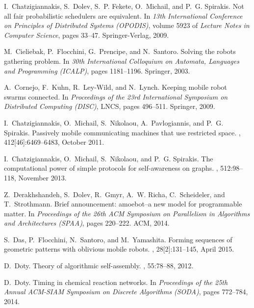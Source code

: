 \documentclass[preprint]{elsarticle}
\begin{document}
\begin{thebibliography}{CKLWL09}
I.~Chatzigiannakis, S.~Dolev, S.~P. Fekete, O.~Michail, and P.~G. Spirakis.
\newblock Not all fair probabilistic schedulers are equivalent.
\newblock In {\em 13th International Conference on Principles of Distributed
  Systems (OPODIS)}, volume 5923 of {\em Lecture Notes in Computer Science},
  pages 33--47. Springer-Verlag, 2009.

M.~Cieliebak, P.~Flocchini, G.~Prencipe, and N.~Santoro.
\newblock Solving the robots gathering problem.
\newblock In {\em 30th International Colloquium on Automata, Languages and
  Programming (ICALP)}, pages 1181--1196. Springer, 2003.

A.~Cornejo, F.~Kuhn, R.~Ley-Wild, and N.~Lynch.
\newblock Keeping mobile robot swarms connected.
\newblock In {\em Proceedings of the 23rd International Symposium on
  Distributed Computing (DISC)}, LNCS, pages 496--511. Springer, 2009.

I.~Chatzigiannakis, O.~Michail, S.~Nikolaou, A.~Pavlogiannis, and P.~G.
  Spirakis.
\newblock Passively mobile communicating machines that use restricted space.
, 412[46]:6469--6483, October 2011.

I.~Chatzigiannakis, O.~Michail, S.~Nikolaou, and P.~G. Spirakis.
\newblock The computational power of simple protocols for self-awareness on
  graphs.
, 512:98--118, November 2013.

Z.~Derakhshandeh, S.~Dolev, R.~Gmyr, A.~W. Richa, C.~Scheideler, and
  T.~Strothmann.
\newblock Brief announcement: amoebot--a new model for programmable matter.
\newblock In {\em Proceedings of the 26th ACM Symposium on Parallelism in
  Algorithms and Architectures (SPAA)}, pages 220--222. ACM, 2014.

S.~Das, P.~Flocchini, N.~Santoro, and M.~Yamashita.
\newblock Forming sequences of geometric patterns with oblivious mobile robots.
, 28[2]:131--145, April 2015.

D.~Doty.
\newblock Theory of algorithmic self-assembly.
, 55:78--88, 2012.

D.~Doty.
\newblock Timing in chemical reaction networks.
\newblock In {\em Proceedings of the 25th Annual ACM-SIAM Symposium on Discrete
  Algorithms (SODA)}, pages 772--784, 2014.


\end{thebibliography}
\end{document}
